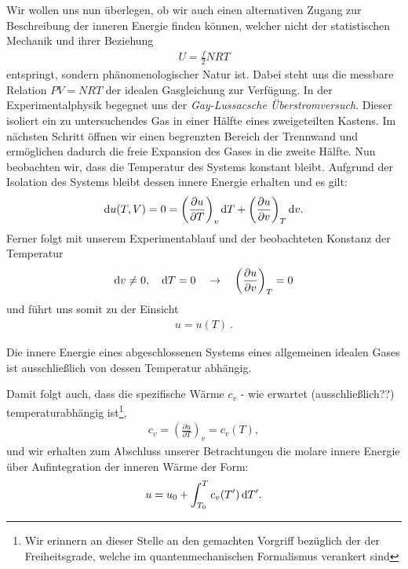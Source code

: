 Wir wollen uns nun überlegen, ob wir auch einen alternativen Zugang zur Beschreibung der inneren Energie finden können, welcher nicht der statistischen Mechanik und ihrer Beziehung
\begin{align*}
    U=\frac{f}{2}NRT
\end{align*}
entspringt, sondern phänomenologischer Natur ist.
Dabei steht uns die messbare Relation $PV=NRT$ der idealen Gasgleichung zur Verfügung.
In der Experimentalphysik begegnet uns der \emph{Gay-Lussacsche Überstromversuch}. Dieser isoliert ein zu untersuchendes Gas in einer Hälfte eines zweigeteilten Kastens. Im nächsten Schritt öffnen wir einen begrenzten Bereich der Trennwand und ermöglichen dadurch die freie Expansion des Gases in die zweite Hälfte. Nun beobachten wir, dass die Temperatur des Systems konstant bleibt.
Aufgrund der Isolation des Systems bleibt dessen innere Energie erhalten und es gilt:
\begin{align*}
    \mathop{}\!\mathrm{d} u(T,V)=0=\left(\frac{\partial u}{\partial T}\right)_v\mathop{}\!\mathrm{d} T+\left(\frac{\partial u}{\partial v}\right)_T\mathop{}\!\mathrm{d} v.
\end{align*}
Ferner folgt mit unserem Experimentablauf und der beobachteten Konstanz der Temperatur
\begin{align*}
    \mathop{}\!\mathrm{d} v \neq 0,\quad\mathop{}\!\mathrm{d} T=0\quad\rightarrow\quad \left(\frac{\partial u}{\partial v}\right)_T=0
\end{align*}
und führt uns somit zu der Einsicht
\begin{align*}
    \boxed{u=u(T)}\:.
\end{align*}
\begin{formal}
    Die innere Energie eines abgeschlossenen Systems eines allgemeinen idealen Gases ist ausschließlich von dessen Temperatur abhängig.
\end{formal}
Damit folgt auch, dass die spezifische Wärme $c_v$ - wie erwartet \textendash{} (ausschließlich??) temperaturabhängig ist\footnote{Wir erinnern an dieser Stelle an den gemachten Vorgriff bezüglich der  der Freiheitsgrade, welche im quantenmechanischen Formalismus verankert sind},
\begin{align*}
    c_v=\left(\frac{\partial u}{\partial T}\right)_v=c_v(T),
\end{align*}
und wir erhalten zum Abschluss unserer Betrachtungen die molare innere Energie über Aufintegration der inneren Wärme der Form:
\begin{align*}
    u=u_0+\int_{T_0}^Tc_v(T')\mathop{}\!\mathrm{d} T'.
\end{align*}
